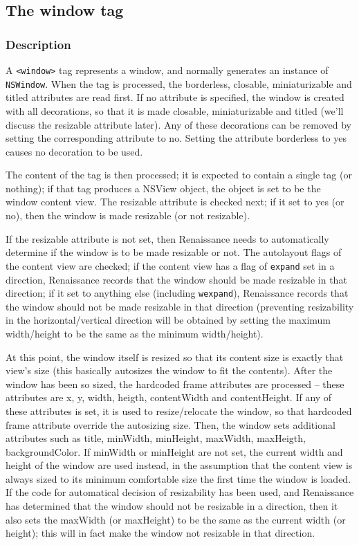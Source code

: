 \subsection{The window tag}
\subsubsection{Description}
A \texttt{<window>} tag represents a window, and normally generates an
instance of \texttt{NSWindow}.  When the tag is processed, the
borderless, closable, miniaturizable and titled attributes are read
first.  If no attribute is specified, the window is created with all
decorations, so that it is made closable, miniaturizable and titled
(we'll discuss the resizable attribute later).  Any of these
decorations can be removed by setting the corresponding attribute to
no.  Setting the attribute borderless to yes causes no decoration to
be used.

The content of the tag is then processed; it is expected to contain a
single tag (or nothing); if that tag produces a NSView object, the
object is set to be the window content view.  The resizable attribute
is checked next; if it set to yes (or no), then the window is made
resizable (or not resizable).

If the resizable attribute is not set, then Renaissance needs to
automatically determine if the window is to be made resizable or not.
The autolayout flags of the content view are checked; if the content
view has a flag of \texttt{expand} set in a direction, Renaissance
records that the window should be made resizable in that direction; if
it set to anything else (including \texttt{wexpand}), Renaissance
records that the window should not be made resizable in that direction
(preventing resizability in the horizontal/vertical direction will be
obtained by setting the maximum width/height to be the same as the
minimum width/height).

At this point, the window itself is resized so that its content size
is exactly that view's size (this basically autosizes the window to
fit the contents).  After the window has been so sized, the hardcoded
frame attributes are processed -- these attributes are x, y, width,
heigth, contentWidth and contentHeight.  If any of these attributes is
set, it is used to resize/relocate the window, so that hardcoded frame
attribute override the autosizing size.  Then, the window sets
additional attributes such as title, minWidth, minHeight, maxWidth,
maxHeigth, backgroundColor.  If minWidth or minHeight are not set, the
current width and height of the window are used instead, in the
assumption that the content view is always sized to its minimum
comfortable size the first time the window is loaded.  If the code for
automatical decision of resizability has been used, and Renaissance
has determined that the window should not be resizable in a direction,
then it also sets the maxWidth (or maxHeight) to be the same as the
current width (or height); this will in fact make the window not
resizable in that direction.

